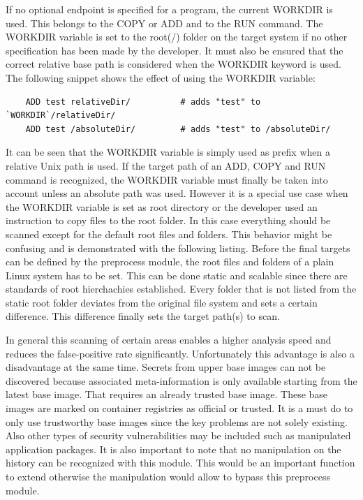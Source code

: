 If no optional endpoint is specified for a program, the current WORKDIR is used. This belongs to the COPY or ADD and to the RUN command.
The WORKDIR variable is set to the root(/) folder on the target system if no other specification has been made by the developer. 
It must also be ensured that the correct relative base path is considered when the WORKDIR keyword is used. 
The following snippet shows the effect of using the WORKDIR variable:
\begin{lstlisting}
	ADD test relativeDir/          # adds "test" to `WORKDIR`/relativeDir/
	ADD test /absoluteDir/         # adds "test" to /absoluteDir/
\end{lstlisting}
It can be seen that the WORKDIR variable is simply used as prefix when a relative Unix path is used.
If the target path of an ADD, COPY and RUN command is recognized, the WORKDIR variable must finally be taken into account unless an absolute path was used.
However it is a special use case when the WORKDIR variable is set as root directory or the developer used an instruction to copy files to the root folder. 
In this case everything should be scanned except for the default root files and folders.
This behavior might be confusing and is demonstrated with the following listing.
Before the final targets can be defined by the preprocess module, the root files and folders of a plain Linux system has to be set. 
This can be done static and scalable since there are standards of root hierchachies established.
Every folder that is not listed from the static root folder deviates from the original file system and sets a certain difference. 
This difference finally sets the target path(s) to scan. 

In general this scanning of certain areas enables a higher analysis speed and reduces the false-positive rate significantly.
Unfortunately this advantage is also a disadvantage at the same time. 
Secrets from upper base images can not be discovered because associated meta-information is only available starting from the latest base image.
That requires an already trusted base image.
These base images are marked on container registries as official or trusted. 
It is a must do to only use trustworthy base images since the key problems are not solely existing. 
Also other types of security vulnerabilities may be included such as manipulated application packages. 
It is also important to note that no manipulation on the history can be recognized with this module. 
This would be an important function to extend otherwise the manipulation would allow to bypass this preprocess module. 

